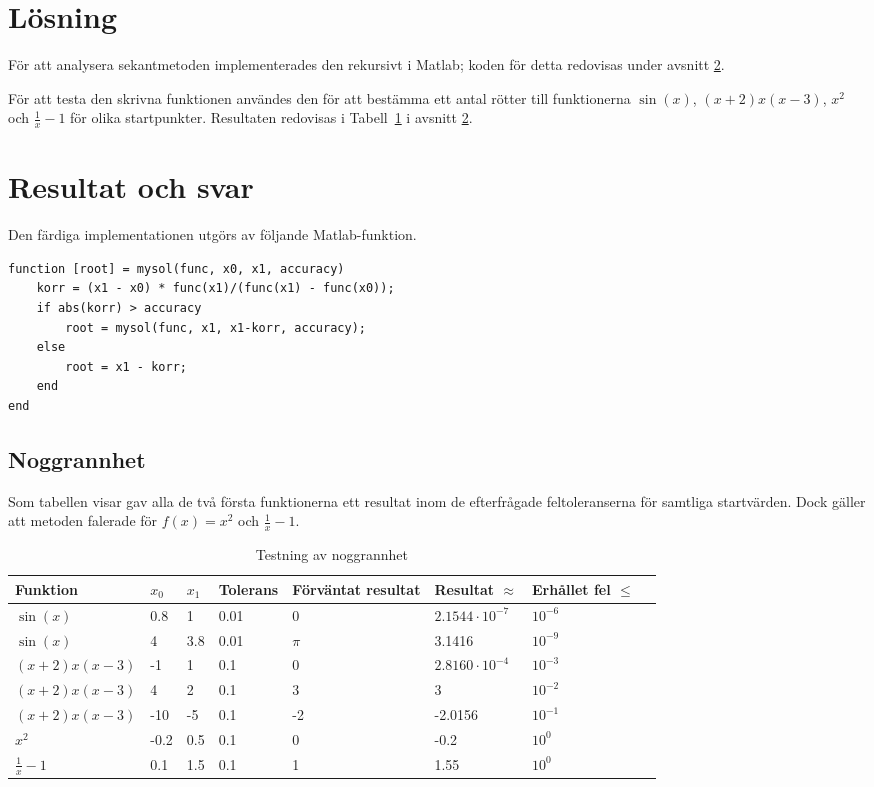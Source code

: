 \documentclass{article}
\begin{document}
\section{Lösning}
För att analysera sekantmetoden implementerades den rekursivt i Matlab; koden för detta redovisas under avsnitt \ref{resultat}. 

För att testa den skrivna funktionen användes den för att bestämma ett antal rötter till funktionerna $\sin(x)$, $ (x+2) x (x-3)$, $x^2$ och $\frac{1}{x} - 1$ för olika startpunkter. Resultaten redovisas i Tabell~\ref{noggrannhet} i avsnitt \ref{resultat}. 

\section{Resultat och svar} \label{resultat}
Den färdiga implementationen utgörs av följande Matlab-funktion.
\begin{lstlisting}
function [root] = mysol(func, x0, x1, accuracy)
    korr = (x1 - x0) * func(x1)/(func(x1) - func(x0));
    if abs(korr) > accuracy
        root = mysol(func, x1, x1-korr, accuracy);
    else
        root = x1 - korr;
    end
end
\end{lstlisting}

\subsection{Noggrannhet}
Som tabellen visar gav alla de två första funktionerna ett resultat inom de efterfrågade feltoleranserna för samtliga startvärden. Dock gäller att metoden falerade för $f(x) = x^2$ och $\frac{1}{x} - 1$.
\begin{table}[H]
  \begin{tabu}{ l l l l X[0.5cm] X l X }
    Funktion & $x_0$ & $x_1$ & Tolerans & Förväntat resultat & Resultat $\approx$ & Erhållet fel $\leq$ \\
    \toprule
    $\sin(x)$ & 0.8 & 1 & 0.01 & 0 & $2.1544 \cdot 10^{-7}$ & $10^{-6}$ \\
    $\sin(x)$ & 4 & 3.8 & 0.01 & $\pi$ & 3.1416 & $10^{-9} $\\
    $ (x+2) x (x-3)$ & -1 & 1 & 0.1 & 0 & $2.8160 \cdot 10^{-4}$ & $10^{-3}$ \\
    $ (x+2) x (x-3)$ & 4 & 2 & 0.1 & 3 & 3 & $10^{-2}$ \\
    $ (x+2) x (x-3)$ & -10 & -5 & 0.1 & -2 & -2.0156 & $10^{-1}$ \\
    $ x^{2}$ & -0.2 & 0.5 & 0.1 & 0 & -0.2  & $10^{0} $ \\
    $ \frac{1}{x} - 1 $ & 0.1 & 1.5 & 0.1 & 1 & 1.55 & $10^{0}$ \\
  \end{tabu}
  \caption{Testning av noggrannhet}\label{noggrannhet}
\end{table}
\end{document}
